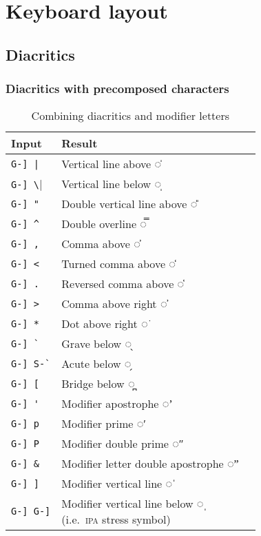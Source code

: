 \documentclass[oneside]{memoir}
\newcommand{\key}{\verb}
\begin{document}
{{\chapter{Keyboard layout}
\label{sec:keyboard_layout}

\section{Diacritics}
\label{sec:diacritics}

\subsection{Diacritics with precomposed characters}
\label{sec:diacritics_with_precomposed_characters}

\begin{wraptable}{r}{5cm}
\centering
\vspace{-2cm}
\cprotect\caption{Combining diacritics and modifier letters}
\label{tab:misc_diacritics_mappings}
\begin{tabular}{ll}
\toprule
Input & Result \\
\midrule
\key!G-] |!   & Vertical line above ◌̍ \\
\key|G-] \|   & Vertical line below ◌̩ \\
\key|G-] "|   & Double vertical line above ◌̎ \\
\key|G-] ^|   & Double overline ◌̿ \\
\key|G-] ,|   & Comma above ◌̓ \\
\key|G-] <|   & Turned comma above ◌̒ \\
\key|G-] .|   & Reversed comma above  ◌̔ \\
\key|G-] >|   & Comma above right ◌̕ \\
\key|G-] *|   & Dot above right ◌͘ \\
\key|G-] `|   & Grave below ◌̖ \\
\key|G-] S-`| & Acute below ◌̗ \\
\key|G-] [|   & Bridge below ◌̪ \\
\midrule
\key|G-] '|   & Modifier apostrophe ◌ʼ \\
\key|G-] p|   & Modifier prime ◌ʹ \\
\key|G-] P|   & Modifier double prime ◌ʺ \\
\key|G-] &|   & Modifier letter double apostrophe ◌ˮ \\
\key|G-] ]|   & Modifier vertical line ◌ˈ \\
\key|G-] G-]| & \makecell{Modifier vertical line below ◌ˌ\\(i.e.\ \textsc{ipa} stress symbol)} \\

\end{tabular}
\end{wraptable}}}
\end{document}
